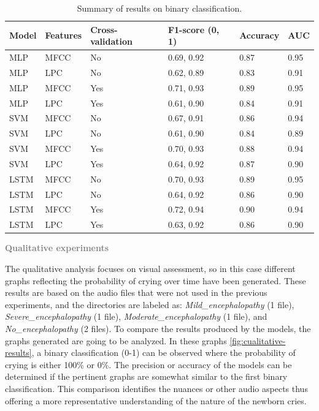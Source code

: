 \begin{table}[!ht]
    \small
    \setlength\extrarowheight{2pt} %
    \begin{tabularx}{\textwidth}{m{1.5cm}m{1.5cm}m{2cm}m{2cm}m{2cm}m{2cm}}
    \toprule
        \rowcolor{orange!10}
        \textbf{Model} & \textbf{Features} & \textbf{Cross-validation} & \textbf{F1-score (0, 1)}  & \textbf{Accuracy} & \textbf{AUC} \\
    \midrule  
    MLP & MFCC & No & 0.69,    0.92 & 0.87 & 0.95 \\
    MLP & LPC & No & 0.62,    0.89 & 0.83 & 0.91 \\
    MLP & MFCC & Yes & 0.71,    0.93 & 0.89 & 0.95 \\
    MLP & LPC & Yes & 0.61,    0.90 & 0.84 & 0.91 \\
    SVM & MFCC & No & 0.67,    0.91 & 0.86 & 0.94 \\
    SVM & LPC & No & 0.61,    0.90 & 0.84 & 0.89 \\
    SVM & MFCC & Yes & 0.70,    0.93 & 0.88 & 0.94 \\
    SVM & LPC & Yes & 0.64,    0.92 & 0.87 & 0.90 \\
    LSTM & MFCC & No & 0.70,    0.93 & 0.89 & 0.95 \\
    LSTM & LPC & No & 0.64,    0.92 & 0.86 & 0.90 \\
    LSTM & MFCC & Yes & 0.72,    0.94 & 0.90 & 0.94 \\
    LSTM & LPC & Yes & 0.63,    0.92 & 0.86 & 0.90 \\
    \bottomrule
    \end{tabularx}
    \vspace{10pt} 
    \caption{Summary of results on binary classification.}
    \label{table:binary-results}
\end{table}

\newpage
{\fontsize{16pt}{16pt}\textcolor{gray}{\textbf{Qualitative  experiments }}}

The qualitative analysis focuses on visual assessment, so in this case different graphs reflecting the probability of crying over time have been generated. These results are based on the audio files that were not used in the previous experiments, and the directories are labeled as: \textit{Mild\_encephalopathy} (1 file), \textit{Severe\_encephalopathy} (1 file), \textit{Moderate\_encephalopathy} (1 file), and \textit{No\_encephalopathy} (2 files). To compare the results produced by the models, the graphs generated are going to be analyzed. In these graphs \ref{fig:cualitative-results}, a binary classification (0-1) can be observed where the probability of crying is either 100\% or 0\%. The precision or accuracy of the models can be determined if the pertinent graphs are somewhat similar to the first binary classification. This comparison identifies the nuances or other audio aspects thus offering a more representative understanding of the nature of the newborn cries. 


